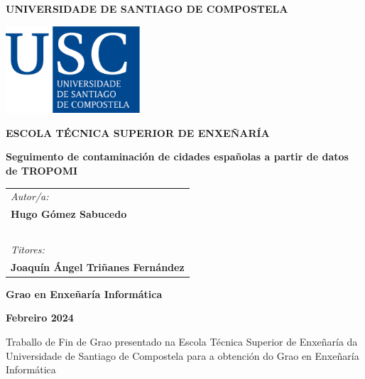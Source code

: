 \pagestyle{empty}
\begin{center}
	{\bf\Large UNIVERSIDADE DE SANTIAGO DE COMPOSTELA}
	
	\vspace{0.5cm}
	\includegraphics[width=5cm]{figuras/logo_usc.eps}
	
	\vspace{0.5cm}
	{\bf\large ESCOLA TÉCNICA SUPERIOR DE ENXEÑARÍA}
	
	\vspace{3cm}
	{\bf\LARGE Seguimento de contaminación de cidades españolas a partir de datos de TROPOMI}
	
\end{center}

\vspace{2cm}
\hspace{4cm}\begin{tabular}{l}
	{\it\Large Autor/a:} \\
	{\bf\Large Hugo Gómez Sabucedo} \\
	~ \\
	{\it\Large Titores:} \\
	{\bf\Large Joaquín Ángel Triñanes Fernández} \\
\end{tabular}

\vspace{2cm}
\begin{center}
	{\bf\Large Grao en Enxeñaría Informática}
	
	\vspace{0.5cm}
	{\bf\large Febreiro 2024}
	
	\vspace{0.5cm}
	Traballo de Fin de Grao presentado na Escola Técnica Superior de Enxeñaría da Universidade de Santiago de Compostela para a obtención do Grao en Enxeñaría Informática
\end{center}

